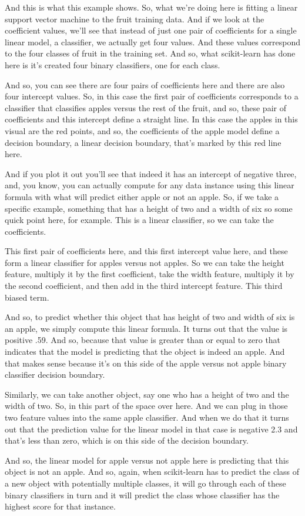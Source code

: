 \begin{multicols}{2}
And this is what this example shows. So, what we're doing here is fitting a linear support vector machine to the fruit training data. And if we look at the coefficient values, we'll see that instead of just one pair of coefficients for a single linear model, a classifier, we actually get four values. And these values correspond to the four classes of fruit in the training set. And so, what scikit-learn has done here is it's created four binary classifiers, one for each class. 

And so, you can see there are four pairs of coefficients here and there are also four intercept values. So, in this case the first pair of coefficients corresponds to a classifier that classifies apples versus the rest of the fruit, and so, these pair of coefficients and this intercept define a straight line. In this case the apples in this visual are the red points, and so, the coefficients of the apple model define a decision boundary, a linear decision boundary, that's marked by this red line here. 

And if you plot it out you'll see that indeed it has an intercept of negative three, and, you know, you can actually compute for any data instance using this linear formula with what will predict either apple or not an apple. So, if we take a specific example, something that has a height of two and a width of six so some quick point here, for example. This is a linear classifier, so we can take the coefficients. 

This first pair of coefficients here, and this first intercept value here, and these form a linear classifier for apples versus not apples. So we can take the height feature, multiply it by the first coefficient, take the width feature, multiply it by the second coefficient, and then add in the third intercept feature. This third biased term. 

And so, to predict whether this object that has height of two and width of six is an apple, we simply compute this linear formula. It turns out that the value is positive .59. And so, because that value is greater than or equal to zero that indicates that the model is predicting that the object is indeed an apple. And that makes sense because it's on this side of the apple versus not apple binary classifier decision boundary. 

Similarly, we can take another object, say one who has a height of two and the width of two. So, in this part of the space over here. And we can plug in those two feature values into the same apple classifier. And when we do that it turns out that the prediction value for the linear model in that case is negative 2.3 and that's less than zero, which is on this side of the decision boundary. 

And so, the linear model for apple versus not apple here is predicting that this object is not an apple. And so, again, when scikit-learn has to predict the class of a new object with potentially multiple classes, it will go through each of these binary classifiers in turn and it will predict the class whose classifier has the highest score for that instance. 

\end{multicols}